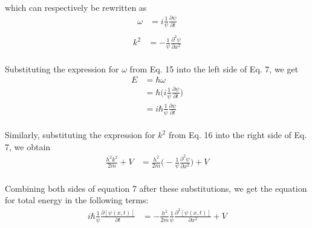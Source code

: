 \documentclass[letter]{article}
\begin{document}
\begin{enumerate}
    \paragraph{}which can respectively be rewritten as
    \begin{equation}
        \begin{split}
            \omega 
            &= i\frac{1}{\psi}\frac{\partial \psi}{\partial t}\\
        \end{split}
    \end{equation}
    \begin{equation}
        \begin{split}
            k^2
            &= -\frac{1}{\psi}\frac{\partial^2 \psi}{\partial x^2}
        \end{split}
    \end{equation}
     \paragraph{}Substituting the expression for $\omega$ from Eq. 15 into the left side of Eq. 7, we get
     \begin{equation}
         \begin{split}
             E  &= \hbar\omega\\
                &= \hbar\bigg(i\frac{1}{\psi}\frac{\partial\psi}{\partial t}\bigg)\\
                &= i\hbar\frac{1}{\psi}\frac{\partial\psi}{\partial t}
         \end{split}
     \end{equation}
    \paragraph{}Similarly, substituting the expression for $k^2$ from Eq. 16 into the right side of Eq. 7, we obtain
    \begin{equation}
        \begin{split}
            \frac{h^2k^2}{2m}+V &= \frac{h^2}{2m}\bigg(-\frac{1}{\psi}\frac{\partial^2\psi}{\partial x^2}\bigg)+V
        \end{split}
    \end{equation}
    \paragraph{}Combining both sides of equation 7 after these substitutions, we get the equation for total energy in the following terms:
    \begin{equation}
        \begin{split}
            i\hbar\frac{1}{\psi}\frac{\partial[\psi(x,t)]}{\partial t}
            &= -\frac{h^2}{2m}\frac{1}{\psi}\frac{\partial^2[\psi(x,t)]}{\partial x^2}+V
        \end{split}
    \end{equation}

\end{enumerate}
\end{document}
